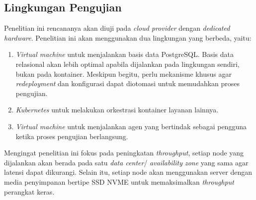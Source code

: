 \subsection{Lingkungan Pengujian}

Penelitian ini rencananya akan diuji pada \textit{cloud provider} dengan \textit{dedicated hardware}. Penelitian ini akan menggunakan dua lingkungan yang berbeda, yaitu:

\begin{enumerate}
    \item \textit{Virtual machine} untuk menjalankan basis data PostgreSQL. Basis data relasional akan lebih optimal apabila dijalankan pada lingkungan sendiri, bukan pada kontainer. Meskipun begitu, perlu mekanisme khusus agar \textit{redeployment} dan konfigurasi dapat diotomasi untuk memudahkan proses pengujian.
    \item \textit{Kubernetes} untuk melakukan orkestrasi kontainer layanan lainnya.
    \item \textit{Virtual machine} untuk menjalankan agen yang bertindak sebagai pengguna ketika proses pengujian berlangsung.
\end{enumerate}

Mengingat penelitian ini fokus pada peningkatan \textit{throughput}, setiap node yang dijalankan akan berada pada satu \textit{data center}/ \textit{availability zone} yang sama agar latensi dapat dikurangi. Selain itu, setiap node akan menggunakan server dengan media penyimpanan bertipe SSD NVME untuk memaksimalkan \textit{throughput} perangkat keras.